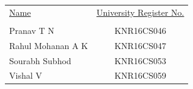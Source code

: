 \begin{table}[!h]
\centering
\begin{tabular}{lc}
\underline{Name} & \underline{University Register No.} \\
\\
Pranav T N & KNR16CS046 \\
Rahul Mohanan A K & KNR16CS047 \\
Sourabh Subhod & KNR16CS053 \\
Vishal V & KNR16CS059 \\
\end{tabular}
\end{table}

  
\vspace*{3cm}
\hspace*{-.5in}
\parbox{2.1in}{
 \\
}
 \parbox{2.1in}{
  \\
 }
\parbox{2.1in}{
\noindent  \\[0.18cm] 
 \\
\\
}
\vspace*{1cm}
\parskip 8pt
\clearpage  
  
